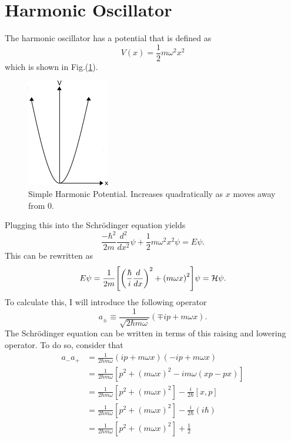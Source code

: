 \section{Harmonic Oscillator}
The harmonic oscillator has a potential that is defined as 
\begin{equation}
    V(x)=\frac{1}{2}m\omega^2 x^2
\end{equation}
which is shown in Fig.(\ref{fig:SHOpot}). 
\begin{figure}
    \centering
    \includegraphics{figures/pdf/SHOpot.png}
    \caption{Simple Harmonic Potential. Increases quadratically as $x$ moves away from 0.}
    \label{fig:SHOpot}
\end{figure}
Plugging this into the Schr\"odinger equation yields
\begin{equation}
    \frac{-\hbar^2}{2m}\frac{d^2}{dx^2}\psi+\frac{1}{2}m\omega^2 x^2\psi=E\psi.
\end{equation}
This can be rewritten as 
\begin{equation}
    E\psi=\frac{1}{2m}\qty[\qty(\frac{\hbar}{i}\frac{d}{dx})^2+\qty(m\omega x)^2]\psi=\mathcal{H}\psi. \label{A.6}
\end{equation}
To calculate this, I will introduce the following operator
\begin{equation}
    a_{\pm}\equiv \frac{1}{\sqrt{2\hbar m \omega}} (\mp ip+m\omega x).
\end{equation}
The Schr\"odinger equation can be written in terms of this raising and lowering operator. To do so, consider that
\begin{align}
    a_-a_+&=\frac{1}{2\hbar m\omega} (ip+m\omega x)(-ip+m\omega x)\nonumber\\
    &=\frac{1}{2\hbar m\omega} [p^2+(m\omega x)^2-im\omega (xp-px)]\nonumber\\
    &=\frac{1}{2\hbar m\omega} [p^2+(m\omega x)^2]-\frac{i}{2\hbar}[x,p]\nonumber\\
    &=\frac{1}{2\hbar m\omega} [p^2+(m\omega x)^2]-\frac{i}{2\hbar}(i\hbar)\nonumber\\
    &=\frac{1}{2\hbar m\omega} [p^2+(m\omega x)^2]+\frac{1}{2}
\end{align}

